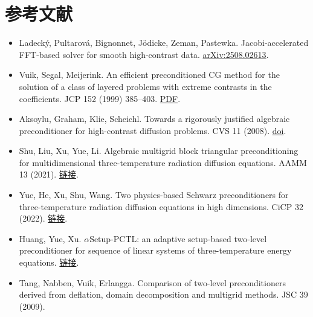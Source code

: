 \documentclass[11pt,a4paper]{ctexart}
\begin{document}
\section*{参考文献}
\begin{itemize}\small
\item Ladecký, Pultarová, Bignonnet, Jödicke, Zeman, Pastewka. Jacobi-accelerated FFT-based solver for smooth high-contrast data. \href{https://arxiv.org/abs/2508.02613}{arXiv:2508.02613}.
\item Vuik, Segal, Meijerink. An efficient preconditioned CG method for the solution of a class of layered problems with extreme contrasts in the coefficients. JCP 152 (1999) 385--403. \href{https://diamhomes.ewi.tudelft.nl/~kvuik/papers/Vui99SM.pdf}{PDF}.
\item Aksoylu, Graham, Klie, Scheichl. Towards a rigorously justified algebraic preconditioner for high-contrast diffusion problems. CVS 11 (2008). \href{https://link.springer.com/doi/10.1007/s00791-008-0105-1}{doi}.
\item Shu, Liu, Xu, Yue, Li. Algebraic multigrid block triangular preconditioning for multidimensional three-temperature radiation diffusion equations. AAMM 13 (2021). \href{https://global-sci.com/article/73007/algebraic-multigrid-block-triangular-preconditioning-for-multidimensional-three-temperature-radiation-diffusion-equations}{链接}.
\item Yue, He, Xu, Shu, Wang. Two physics-based Schwarz preconditioners for three-temperature radiation diffusion equations in high dimensions. CiCP 32 (2022). \href{https://ojs.global-sci.org/index.php/cicp/article/view/7101}{链接}.
\item Huang, Yue, Xu. $\alpha$Setup-PCTL: an adaptive setup-based two-level preconditioner for sequence of linear systems of three-temperature energy equations. \href{https://global-sci.com/article/79497/asetup-pctl-an-adaptive-setup-based-two-level-preconditioner-for-sequence-of-linear-systems-of-three-temperature-energy-equations}{链接}.
\item Tang, Nabben, Vuik, Erlangga. Comparison of two-level preconditioners derived from deflation, domain decomposition and multigrid methods. JSC 39 (2009).
\end{itemize}
\end{document}
